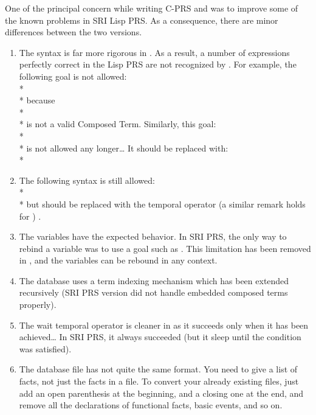 One of the principal concern while writing C-PRS and \COPRS{} was to
improve some of the known problems in SRI Lisp PRS. As a consequence, there
are minor differences between the two versions.

\begin{enumerate}

\item The syntax is far more rigorous in \COPRS{}. As a result, a
number of expressions perfectly correct in the Lisp PRS are not
recognized by \COPRS{}. For example, the following goal is not allowed: \\*
 \\*
because \\*
 \\*
is not a valid Composed Term. Similarly, this goal: \\*
 \\*
is not allowed any longer\dots{} It should be replaced with: \\*

\item The following syntax is still allowed: \\*
 \\*
but should be replaced with the \code{=>} temporal operator (a similar
remark holds for \code{\~{}>}) .

\item The  variables have the expected behavior. In SRI PRS, the
only way to rebind a variable was to use a goal such as . This limitation has been removed in \COPRS{}, and the 
variables can be rebound in any context.

\item The database uses a term indexing mechanism which has been extended
recursively (SRI PRS version did not handle embedded composed terms
properly).

\item The wait temporal operator is cleaner in \COPRS{} as it succeeds only
when it has been achieved\dots{} In SRI PRS, it always succeeded (but it
sleep until the condition was satisfied).

\item The database file has not quite the same format. You need to give a
list of facts, not just the facts in a file. To convert your already
existing files, just add an open parenthesis at the beginning, and a
closing one at the end, and remove all the declarations of functional
facts, basic events, and so on.


\end{enumerate}

